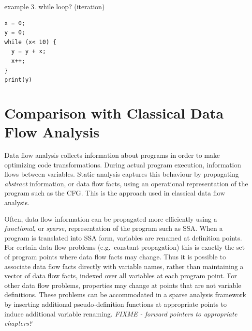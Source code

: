 
example 3. while loop? (iteration)

\begin{verbatim}
x = 0;
y = 0;
while (x< 10) {
  y = y + x;
  x++;
}
print(y)
\end{verbatim}






\section{Comparison with Classical Data Flow Analysis}


Data flow analysis collects information about programs
in order to make optimizing code transformations.
During actual program execution, information flows between
variables. Static analysis captures
this behaviour by propagating \textit{abstract} information,
or data flow facts,
using an operational representation of the 
program such as the CFG. This is the approach used in 
classical data flow analysis.

Often, data flow information can be propagated more efficiently
using a \textit{functional}, or \textit{sparse},
representation of the program such 
as SSA.
When a program is translated into SSA form,
variables are renamed at definition points.
For certain data flow problems (e.g.\ constant propagation)
this is exactly the set of program points where data flow
facts may change.
Thus it is possible to associate data flow facts directly with 
variable names, rather than
maintaining a vector of data flow facts, indexed over all variables
at each program point.
For other data flow problems, properties may 
change at points that are not variable definitions.
These problems can be accommodated in a sparse analysis framework
by inserting additional pseudo-definition functions at appropriate 
points
to induce additional variable renaming. \emph{FIXME - forward pointers to
appropriate chapters?}


